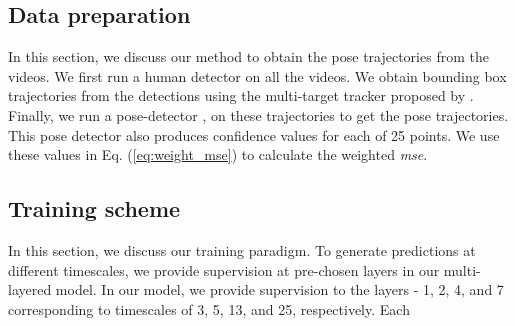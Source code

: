 \documentclass[conference]{IEEEtran}
\begin{document}
\subsection{Data preparation}
In this section, we discuss our method to obtain the pose trajectories from the videos. We first run a human detector \cite{detector} on all the videos. We obtain bounding box trajectories from the detections using the multi-target tracker proposed by \cite{mtt}. Finally, we run a pose-detector \cite{openpose}, \cite{openpose_RT} on these trajectories to get the pose trajectories. This pose detector also produces confidence values for each of 25 points. We use these values in Eq. (\ref{eq:weight_mse}) to calculate the weighted \textit{mse}. 



\subsection{Training scheme}
In this section, we discuss our training paradigm. To generate predictions at different timescales, we provide supervision at pre-chosen layers in our multi-layered model. In our model, we provide supervision to the layers - 1, 2, 4, and 7 corresponding to timescales of 3, 5, 13, and 25, respectively. Each
\end{document}
